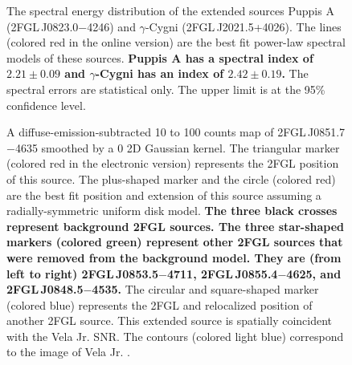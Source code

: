 \documentclass[12pt,preprint]{aastex}
\newif\ifcolorfigure
\newcommand{\gev}{\text{GeV}\xspace}
\newcommand{\tev}{\text{TeV}\xspace}
\newcommand{\newtext}[1]{{\bfseries \color{red}#1}}
\begin{document}
\clearpage
\begin{figure}
    \ifcolorfigure
      \plotone{summary_plots/snr_seds_color.eps}
    \else
    \fi
    \caption{
    The spectral energy distribution of the extended sources 
    Puppis A (2FGL\,J0823.0$-$4246) and $\gamma$-Cygni 
    (2FGL\,J2021.5+4026).
    The lines (colored red in the online version)
    are the best fit power-law spectral models of
    these sources. \newtext{Puppis A has a spectral index of
    $2.21\pm0.09$ and $\gamma$-Cygni has an
    index of $2.42\pm0.19$.}
    The spectral errors are statistical only.
    The upper limit is at the 95\% confidence level.
    }
    \label{snr_seds}
  \end{figure}




\begin{figure}
    \ifcolorfigure
      \plotone{source_plots/source_Vela_Jr_color.eps}
    \else
    \fi
  \caption{A diffuse-emission-subtracted 10 \gev to 100 \gev counts map of
  2FGL\,J0851.7$-$4635 smoothed by a 0 2D Gaussian
  kernel. The triangular marker (colored red in the electronic version)
  represents the 2FGL position of this source.  The plus-shaped marker
  and the circle (colored red) are the best fit position and extension of
  this source assuming a radially-symmetric uniform disk model.
  \newtext{The three black crosses represent background 2FGL sources.
  The three star-shaped markers (colored green) represent other 2FGL sources
  that were removed from the background model.
  They are (from left to right) 2FGL\,J0853.5$-$4711, 2FGL\,J0855.4$-$4625, and 
  2FGL\,J0848.5$-$4535.}
  The circular and square-shaped
  marker (colored blue) represents the 2FGL and relocalized position of another 2FGL source.  
  This extended source is spatially
  coincident with the Vela Jr. SNR.  The contours (colored light blue)
  correspond to the \tev image of Vela Jr.
  \citep{vela_jr_hess}.
  }\label{Vela_Jr}
\end{figure}
\end{document}
